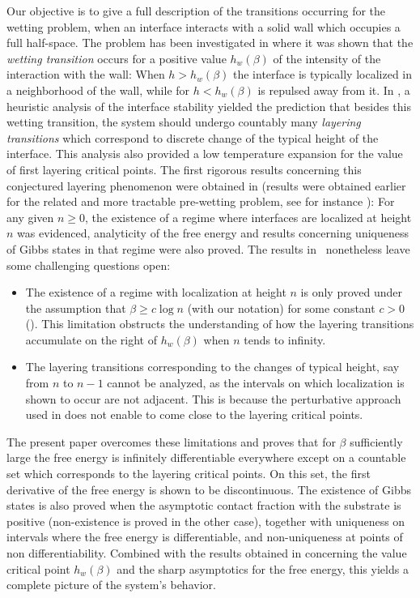 \documentclass[JEP,XML,SOM,Unicode, NoFloatCountersInSection]{cedram}
\numberwithin{equation}{section}
\theoremstyle{plain}
\theoremstyle{definition}
\newcommand{\gb}{\beta}
\begin{document}
Our objective is to give a full description of the transitions occurring for the wetting problem,
when an interface interacts with a solid wall which occupies a full half-space.
The problem has been investigated in \cite{cf:chal} where it was shown that the \textit{wetting transition}
occurs for a positive value $h_w(\gb)$
of the intensity of the interaction with the wall: When $h>h_w(\gb)$ the interface is typically localized in a neighborhood of the wall, while for $h<h_w(\gb)$
is repulsed away from it.
In \cite{cf:AY}, a heuristic analysis of the interface stability yielded the prediction that besides this wetting transition, the system should undergo
countably many \textit{layering transitions} which correspond to discrete change of the typical height of the interface.
This analysis also provided a low temperature expansion for the value of first layering critical points.
The first rigorous results concerning this conjectured layering phenomenon were obtained in \cite{cf:ADM}
(results were obtained earlier for the related and more tractable pre-wetting problem, see for instance \cite{cf:CM, cf:DM}): For any given $n\ge 0$, the existence of a
regime where interfaces are localized at height $n$ was evidenced, analyticity of the free energy and results concerning uniqueness of Gibbs states in that regime
were also proved.
The results in~\cite{cf:ADM} nonetheless leave some challenging questions open:
\begin{itemize}
\item [(A)] The existence of a regime with localization at height $n$ is only proved under the assumption that $\gb\ge c \log n$ (with our notation) for some constant $c>0$
(\cf \cite[Rem.\,(4) p.\,528]{cf:ADM}). This limitation obstructs the understanding of how the layering transitions accumulate on the right of $h_w(\gb)$ when $n$ tends to infinity.
\item [(B)] The layering transitions corresponding to the changes of typical height, say from $n$ to $n-1$ cannot be analyzed,
as the intervals on which localization is
shown to occur are not adjacent. This is because the perturbative approach used in \cite{cf:ADM} does not enable to come close to the layering critical points.
\end{itemize}
The present paper overcomes these limitations and proves that for $\gb$ sufficiently large
the free energy is infinitely differentiable everywhere except on a countable set which
corresponds to the layering critical points. On this set, the first derivative of the free energy is shown to be discontinuous.
The existence of Gibbs states is also proved when the asymptotic contact fraction with the substrate is positive (non-existence is proved in the other case), together with uniqueness on intervals
where the free energy is differentiable, and non-uniqueness at points of non differentiability.
Combined with the results obtained in \cite{cf:part1} concerning the value critical point $h_w(\gb)$
and the sharp asymptotics for the free energy, this yields a complete picture of the system's behavior.
\end{document}
